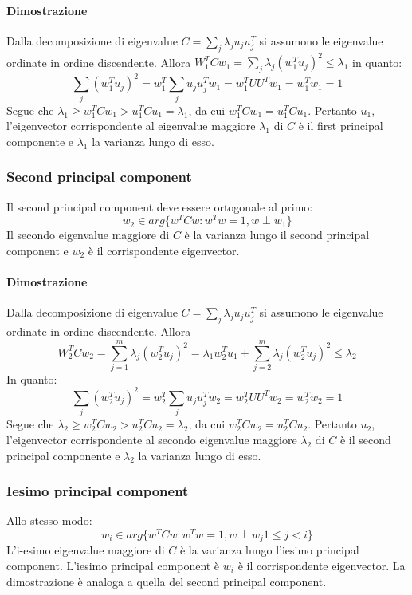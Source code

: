 			\paragraph{Dimostrazione}
			Dalla decomposizione di eigenvalue $C=\sum\limits_j\lambda_ju_ju_j^T$ si assumono le eigenvalue ordinate in ordine discendente.
			Allora $W_1^TCw_1 = \sum\limits_j\lambda_j(w_1^Tu_j)^2\le\lambda_1$ in quanto:
			$$\sum\limits_j(w_1^Tu_j)^2 = w_1^T\sum\limits_ju_ju_j^Tw_1=w_1^TUU^Tw_1=w_1^Tw_1=1$$
			Segue che $\lambda_1\ge w_1^TCw_1 >u_1^TCu_1=\lambda_1$, da cui $w_1^TCw_1=u_1^TCu_1$.
			Pertanto $u_1$, l'eigenvector corrispondente al eigenvalue maggiore $\lambda_1$ di $C$ \`e il first principal componente e $\lambda_1$ la varianza lungo di esso.

		\subsubsection{Second principal component}
		Il second principal component deve essere ortogonale al primo:
		$$w_2\in arg\{w^TCw:w^Tw=1,w\perp w_1\}$$
		Il secondo eigenvalue maggiore di $C$ \`e la varianza lungo il second principal component e $w_2$ \`e il corrispondente eigenvector.

			\paragraph{Dimostrazione}
			Dalla decomposizione di eigenvalue $C=\sum\limits_j\lambda_ju_ju_j^T$ si assumono le eigenvalue ordinate in ordine discendente.
			Allora
			$$W_2^TCw_2 = \sum\limits_{j=1}^m\lambda_j(w_2^Tu_j)^2=\lambda_1w_2^Tu_1+\sum\limits_{j=2}^m\lambda_j(w_2^Tu_j)^2\le\lambda_2$$
			In quanto:
			$$\sum\limits_j(w_2^Tu_j)^2 = w_2^T\sum\limits_ju_ju_j^Tw_2=w_2^TUU^Tw_2=w_2^Tw_2=1$$
			Segue che $\lambda_2\ge w_2^TCw_2 >u_2^TCu_2=\lambda_2$, da cui $w_2^TCw_2=u_2^TCu_2$.
			Pertanto $u_2$, l'eigenvector corrispondente al secondo eigenvalue maggiore $\lambda_2$ di $C$ \`e il second principal componente e $\lambda_2$ la varianza lungo di esso.

		\subsubsection{Iesimo principal component}
		Allo stesso modo:
		$$w_i\in arg\{w^TCw:w^Tw=1,w\perp w_j 1\le j < i\}$$
		L'i-esimo eigenvalue maggiore di $C$ \`e la varianza lungo l'iesimo principal component.
		L'iesimo principal component \`e $w_i$ \`e il corrispondente eigenvector.
		La dimostrazione \`e analoga a quella del second principal component.

